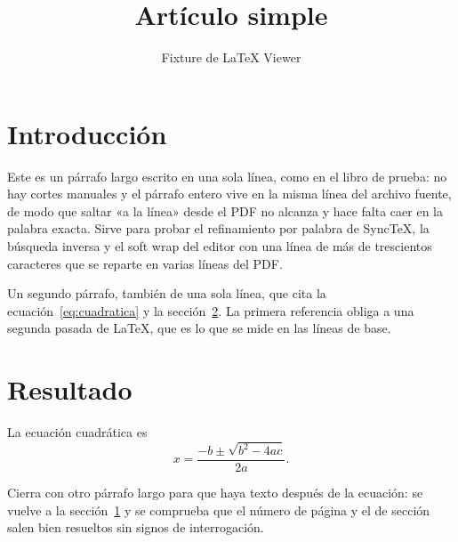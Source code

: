 \documentclass[11pt]{article}
\title{Artículo simple}
\author{Fixture de LaTeX Viewer}
\date{}
\begin{document}
\maketitle

\section{Introducción}\label{sec:intro}

Este es un párrafo largo escrito en una sola línea, como en el libro de prueba: no hay cortes manuales y el párrafo entero vive en la misma línea del archivo fuente, de modo que saltar «a la línea» desde el PDF no alcanza y hace falta caer en la palabra exacta. Sirve para probar el refinamiento por palabra de SyncTeX, la búsqueda inversa y el soft wrap del editor con una línea de más de trescientos caracteres que se reparte en varias líneas del PDF.

Un segundo párrafo, también de una sola línea, que cita la ecuación~\eqref{eq:cuadratica} y la sección~\ref{sec:resultado}. La primera referencia obliga a una segunda pasada de LaTeX, que es lo que se mide en las líneas de base.

\section{Resultado}\label{sec:resultado}

La ecuación cuadrática es
\begin{equation}\label{eq:cuadratica}
  x = \frac{-b \pm \sqrt{b^2 - 4ac}}{2a}.
\end{equation}

Cierra con otro párrafo largo para que haya texto después de la ecuación: se vuelve a la sección~\ref{sec:intro} y se comprueba que el número de página y el de sección salen bien resueltos sin signos de interrogación.
\end{document}
